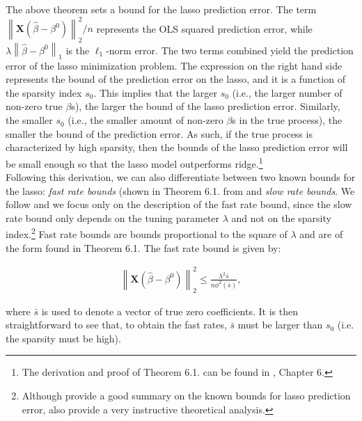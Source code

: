 \noindent The above theorem sets a bound for the lasso prediction error. The term $\left\|\mathbf{X}\left(\hat{\beta}-\beta^{0}\right)\right\|_{2}^{2} /n$ represents the OLS squared prediction error, while $\lambda\left\|\hat{\beta}-\beta^{0}\right\|_{1}$ is the $\ell_1$-norm error. The two terms combined yield the prediction error of the lasso minimization problem. The expression on the right hand side represents the bound of the prediction error on the lasso, and it is a function of the sparsity index $s_0$. This implies that the larger $s_0$ (i.e., the larger number of non-zero true $\beta$s), the larger the bound of the lasso prediction error. Similarly, the smaller $s_0$ (i.e., the smaller amount of non-zero $\beta$s in the true process), the smaller the bound of the prediction error. As such, if the true process is characterized by high sparsity, then the bounds of the lasso prediction error will be small enough so that the lasso model outperforms ridge.\footnote{The derivation and proof of Theorem 6.1. can be found in \cite{buhlmann2011statistics}, Chapter 6.} \\

\noindent Following this derivation, we can also differentiate between two known bounds for the lasso: \textit{fast rate bounds} (shown in Theorem 6.1. from \cite{buhlmann2011statistics} and \textit{slow rate bounds}. We follow \cite{hebiri2012correlations} and we focus only on the description of the fast rate bound, since the slow rate bound only depends on the tuning parameter $\lambda$ and not on the sparsity index.\footnote{Although \cite{hebiri2012correlations} provide a good summary on the known bounds for lasso prediction error, \cite{tibshirani2016closer} also provide a very instructive theoretical analysis.} Fast rate bounds are bounds proportional to the square of $\lambda$ and are of the form found in Theorem 6.1. The fast rate bound is given by:

\begin{align}
    \left\|\mathbf{X}\left(\hat{\beta}-\beta^{0}\right)\right\|_{2}^{2} \leq \frac{\lambda^{2} {\bar{s}}}{n \phi^{2}({\bar{s}})},
\end{align}

\noindent where $\bar{s}$ is used to denote a vector of true zero coefficients. It is then straightforward to see that, to obtain the fast rates, $\bar{s}$ must be larger than $s_0$ (i.e. the sparsity must be high).\\


